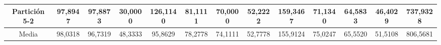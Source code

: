 \documentclass[12pt]{article}
\begin{document}
\begin{table}[]
{\begin{tabular}{|c|cccc|cccc|cccc|}
Partición 5-2 & \multicolumn{1}{c|}{97,8947}                                                  & \multicolumn{1}{c|}{97,8873}                                                 & \multicolumn{1}{c|}{30,0000} & 126,1140 & \multicolumn{1}{c|}{81,1111}                                                  & \multicolumn{1}{c|}{70,0000}                                                 & \multicolumn{1}{c|}{52,2222} & 159,3467 & \multicolumn{1}{c|}{71,1340}                                                  & \multicolumn{1}{c|}{64,5833}                                                 & \multicolumn{1}{c|}{46,4029} & 737,9328 \\ \hline
Media         & \multicolumn{1}{c|}{98,0318}                                                  & \multicolumn{1}{c|}{96,7319}                                                 & \multicolumn{1}{c|}{48,3333} & 95,8629  & \multicolumn{1}{c|}{78,2778}                                                  & \multicolumn{1}{c|}{74,1111}                                                 & \multicolumn{1}{c|}{52,7778} & 155,9124 & \multicolumn{1}{c|}{75,0247}                                                  & \multicolumn{1}{c|}{65,5520}                                                 & \multicolumn{1}{c|}{51,5108} & 806,5681 \\ \hline
\end{tabular}}
\end{table}
\end{document}
